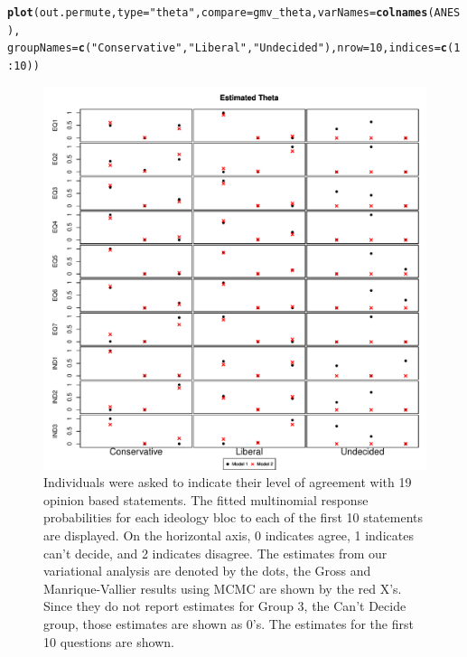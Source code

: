 \documentclass{article}\usepackage[]{graphicx}\usepackage[]{color}
\makeatletter
\def\maxwidth{ %
  \ifdim\Gin@nat@width>\linewidth
    \linewidth
  \else
    \Gin@nat@width
  \fi
}
\newcommand{\hlnum}[1]{\textcolor[rgb]{0.686,0.059,0.569}{#1}}%
\newcommand{\hlstr}[1]{\textcolor[rgb]{0.192,0.494,0.8}{#1}}%
\newcommand{\hlopt}[1]{\textcolor[rgb]{0,0,0}{#1}}%
\newcommand{\hlstd}[1]{\textcolor[rgb]{0.345,0.345,0.345}{#1}}%
\newcommand{\hlkwc}[1]{\textcolor[rgb]{0.333,0.667,0.333}{#1}}%
\newcommand{\hlkwd}[1]{\textcolor[rgb]{0.737,0.353,0.396}{\textbf{#1}}}%
\newenvironment{kframe}{%
 \def\at@end@of@kframe{}%
 \ifinner\ifhmode%
  \def\at@end@of@kframe{\end{minipage}}%
  \begin{minipage}{\columnwidth}%
 \fi\fi%
 \def\FrameCommand##1{\hskip\@totalleftmargin \hskip-\fboxsep
 \colorbox{shadecolor}{##1}\hskip-\fboxsep
     \hskip-\linewidth \hskip-\@totalleftmargin \hskip\columnwidth}%
 \MakeFramed {\advance\hsize-\width
   \@totalleftmargin\z@ \linewidth\hsize
   \@setminipage}}%
 {\par\unskip\endMakeFramed%
 \at@end@of@kframe}
\newenvironment{knitrout}{}{} %
\renewenvironment{knitrout}{\begin{singlespace}}{\end{singlespace}}
\makeatother
\begin{document}
\begin{knitrout}
\color{fgcolor}\begin{kframe}
\begin{alltt}
\hlkwd{plot}\hlstd{(out.permute,} \hlkwc{type} \hlstd{=} \hlstr{"theta"}\hlstd{,} \hlkwc{compare} \hlstd{= gmv_theta,} \hlkwc{varNames} \hlstd{=} \hlkwd{colnames}\hlstd{(ANES),}
         \hlkwc{groupNames} \hlstd{=} \hlkwd{c}\hlstd{(}\hlstr{"Conservative"}\hlstd{,} \hlstr{"Liberal"}\hlstd{,} \hlstr{"Undecided"}\hlstd{),} \hlkwc{nrow} \hlstd{=} \hlnum{10}\hlstd{,} \hlkwc{indices} \hlstd{=} \hlkwd{c}\hlstd{(}\hlnum{1}\hlopt{:}\hlnum{10}\hlstd{))}
\end{alltt}
\end{kframe}\begin{figure}

{\centering \includegraphics[width=\maxwidth]{figure/theta-1} 

}

\caption[Individuals were asked to indicate their level of agreement with 19 opinion based statements]{Individuals were asked to indicate their level of agreement with 19 opinion based statements. The fitted multinomial response probabilities for each ideology bloc to each of the first 10 statements are displayed. On the horizontal axis, 0 indicates agree, 1 indicates can't decide, and 2 indicates disagree. The estimates from our variational analysis are denoted by the dots, the Gross and Manrique-Vallier results using MCMC are shown by the red X's. Since they do not report estimates for Group 3, the Can't Decide group, those estimates are shown as 0's. The estimates for the first 10 questions are shown.\label{fig:theta}}
\end{figure}


\end{knitrout}
\end{document}
